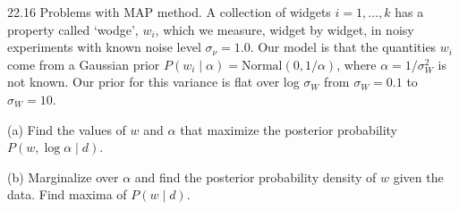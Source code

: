 \documentclass[12pt, a4paper]{article}
\begin{document}
\begin{prob}{22.16}
Problems with MAP method. A collection of widgets $i = 1,\ldots,k$ has a property called `wodge', $w_i$, which we measure, widget by widget, in noisy experiments with known noise level $\sigma_\nu = 1.0$. Our model is that the quantities $w_i$ come from a Gaussian prior $P(w_i\mid\alpha) = \mathrm{Normal}(0,1/\alpha)$, where $\alpha=1/\sigma_W^2$ is not known. Our prior for this variance is flat over log $\sigma_W$ from $\sigma_W=0.1$ to $\sigma_W=10$.

(a) Find the values of $w$ and $\alpha$ that maximize the posterior probability $P(w, \log\alpha \mid d)$.

(b) Marginalize over $\alpha$ and find the posterior probability density of $w$ given the data. Find maxima of $P(w\mid d)$.
\end{prob}
\begin{sol}
\end{sol}
\bigskip
\end{document}
